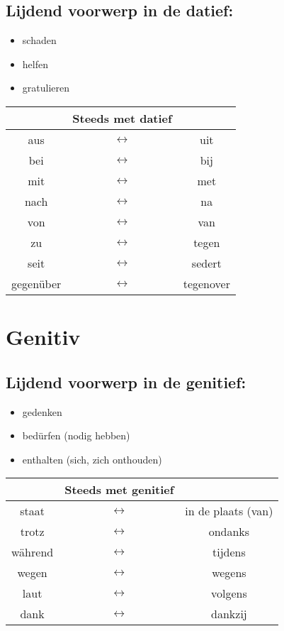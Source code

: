 \documentclass[main.tex]{subfiles}
\begin{document}
\subsection{Lijdend voorwerp in de datief:}
\begin{itemize}
\item schaden
\item helfen
\item gratulieren
\end{itemize}

\begin{tabular}{ccc}
 & Steeds met datief &  \\ 
\hline
aus & $\leftrightarrow$ & uit \\ 
bei & $\leftrightarrow$ & bij \\ 
mit & $\leftrightarrow$ & met \\ 
nach & $\leftrightarrow$ & na \\ 
von & $\leftrightarrow$ & van \\ 
zu & $\leftrightarrow$ & tegen \\ 
seit & $\leftrightarrow$ & sedert \\ 
gegenüber & $\leftrightarrow$ & tegenover \\ 
\end{tabular} 
\section{Genitiv}
\subsection{Lijdend voorwerp in de genitief:}
\begin{itemize}
\item gedenken
\item bedürfen (nodig hebben)
\item enthalten (sich, zich onthouden)
\end{itemize}

\begin{tabular}{ccc}
 & Steeds met genitief &  \\ 
 \hline
staat & $\leftrightarrow$ & in de plaats (van) \\ 
trotz & $\leftrightarrow$ & ondanks \\ 
während & $\leftrightarrow$ & tijdens \\ 
wegen & $\leftrightarrow$ & wegens \\ 
laut & $\leftrightarrow$ & volgens \\ 
dank & $\leftrightarrow$ & dankzij \\ 
\end{tabular} 
\end{document}
